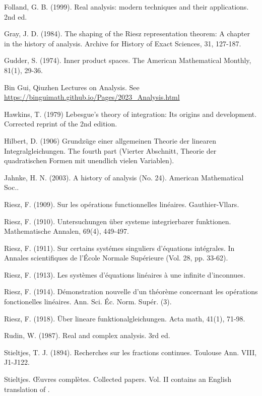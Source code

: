 \documentclass[12pt,b5paper,notitlepage]{article}
\theoremstyle{definition}
\theoremstyle{plain}
\numberwithin{equation}{section}
\begin{document}
	\begin{thebibliography}{999999}
		\footnotesize	

Folland, G. B. (1999). Real analysis: modern techniques and their applications. 2nd ed.

Gray, J. D. (1984). The shaping of the Riesz representation theorem: A chapter in the history of analysis. Archive for History of Exact Sciences, 31, 127-187.

Gudder, S. (1974). Inner product spaces. The American Mathematical Monthly, 81(1), 29-36.

Bin Gui, Qiuzhen Lectures on Analysis. See \url{https://binguimath.github.io/Pages/2023_Analysis.html}

Hawkins, T. (1979) Lebesgue's theory of integration: Its origins and development. Corrected reprint of the 2nd edition. 

Hilbert, D. (1906) Grundz\"uge einer allgemeinen Theorie der linearen Integralgleichungen. The fourth part (Vierter Abschnitt, Theorie der quadratischen Formen mit unendlich vielen Variablen).

Jahnke, H. N. (2003). A history of analysis (No. 24). American Mathematical Soc..

Riesz, F. (1909). Sur les op\'erations functionnelles lin\'eaires. Gauthier-Vllars.

Riesz, F. (1910). Untersuchungen \"uber systeme integrierbarer funktionen. Mathematische Annalen, 69(4), 449-497.


Riesz, F. (1911). Sur certains syst\'emes singuliers d'\'equations int\'egrales. In Annales scientifiques de l'\'Ecole Normale Sup\'erieure (Vol. 28, pp. 33-62).

Riesz, F. (1913). Les syst\`emes d'\'equations lin\'eaires \`a une infinite d'inconnues.


Riesz, F. (1914). D{\'e}monstration nouvelle d'un th{\'e}or{\`e}me concernant les op{\'e}rations fonctionelles lin{\'e}aires. Ann. Sci. {\'E}c. Norm. Sup{\'e}r. (3).

Riesz, F. (1918). \"Uber lineare funktionalgleichungen. Acta math, 41(1), 71-98.

Rudin, W. (1987). Real and complex analysis. 3rd ed.


Stieltjes, T. J. (1894). Recherches sur les fractions continues. Toulouse Ann. VIII, J1-J122.

Stieltjes. {\OE}uvres compl{\`e}tes. {Collected} papers. Vol. II contains an English translation of \cite{Sti94}.


		
\end{thebibliography}


\end{document}
